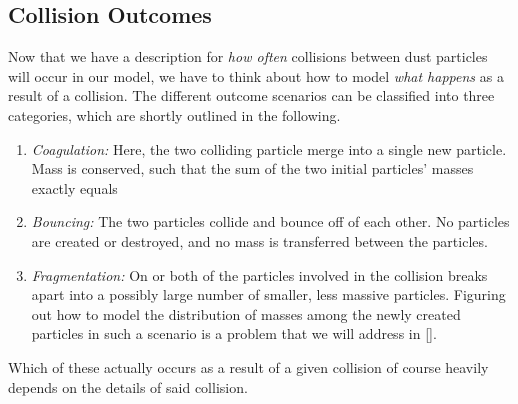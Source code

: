         

    \clearpage\subsection{Collision Outcomes}

        Now that we have a description for \textit{how often} collisions between dust particles 
        will occur in our model, we have to think about how to model \textit{what happens} as a 
        result of a collision.
        The different outcome scenarios can be classified into three categories, which are 
        shortly outlined in the following. 
        \begin{enumerate}
            \item \textit{Coagulation:} Here, the two colliding particle merge into a single 
                  new particle. Mass is conserved, such that the sum of the two initial particles'
                  masses exactly equals
            \item \textit{Bouncing:} The two particles collide and bounce off of each other.
                  No particles are created or destroyed, and no mass is transferred between the 
                  particles.
            \item \textit{Fragmentation:} On or both of the particles involved in the collision 
                  breaks apart into a possibly large number of smaller, less massive particles.
                  Figuring out how to model the distribution of masses among the newly 
                  created particles in such a scenario is a problem that we will address in 
                  [].
        \end{enumerate}
        Which of these actually occurs as a result of a given collision of course heavily depends 
        on the details of said collision. \\

